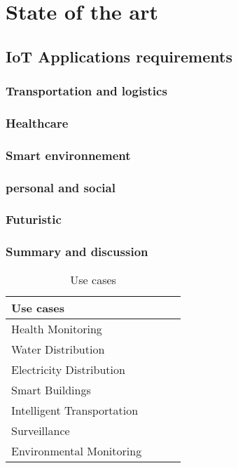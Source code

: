 
\chapter{State of the art \cite{bregell_hardware_2015}} %


\section{IoT Applications requirements} %
\label{sec:section_name}

\subsection{Transportation and logistics}
\subsection{Healthcare}
\subsection{Smart environnement}
\subsection{personal and social}
\subsection{Futuristic}
\subsection{Summary and discussion}








\begin{table}[h!]
\scriptsize
	\begin{tabular}{l|l|l|l}
	\textbf{Use cases}         &  &  & \\\hline
	Health Monitoring          &  &  & \\\hline
	Water Distribution         &  &  & \\\hline
	Electricity Distribution   &  &  & \\\hline
	Smart Buildings            &  &  & \\\hline
	Intelligent Transportation &  &  & \\\hline
	Surveillance               &  &  & \\\hline
	Environmental Monitoring   &  &  & \\
	\end{tabular}
	\caption{\label{tab:IoTUseCase} Use cases \cite{hancke_role_2012}}
\end{table}


